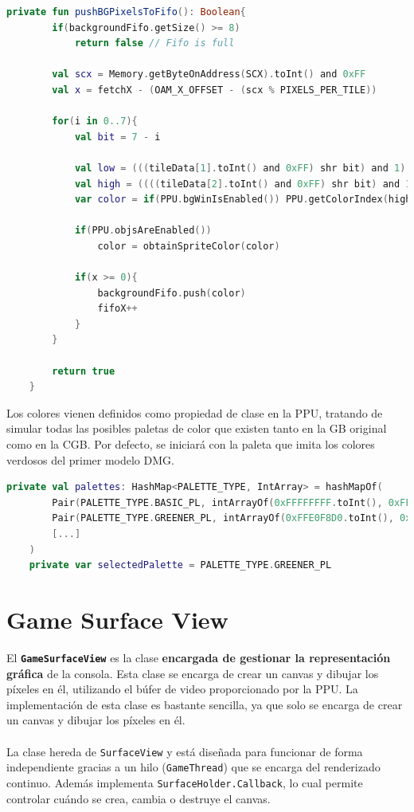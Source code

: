 \begin{lstlisting}[language=Kotlin, caption={FIFO Fetcher - Push de Píxeles al FIFO.}, label={code:ppufifopushpixels}]
    private fun pushBGPixelsToFifo(): Boolean{
        if(backgroundFifo.getSize() >= 8)
            return false // Fifo is full

        val scx = Memory.getByteOnAddress(SCX).toInt() and 0xFF
        val x = fetchX - (OAM_X_OFFSET - (scx % PIXELS_PER_TILE))

        for(i in 0..7){
            val bit = 7 - i

            val low = (((tileData[1].toInt() and 0xFF) shr bit) and 1)
            val high = ((((tileData[2].toInt() and 0xFF) shr bit) and 1) shl 1)
            var color = if(PPU.bgWinIsEnabled()) PPU.getColorIndex(high or low) else PPU.getColorIndex(0) // Pixel Color

            if(PPU.objsAreEnabled())
                color = obtainSpriteColor(color)

            if(x >= 0){
                backgroundFifo.push(color)
                fifoX++
            }
        }

        return true
    }
\end{lstlisting}

Los colores vienen definidos como propiedad de clase en la PPU, tratando de simular todas las posibles paletas de color que existen tanto en la GB original como en la CGB. Por defecto, se iniciará con la paleta que imita los colores verdosos del primer modelo DMG.

\begin{lstlisting}[language=Kotlin, caption={PPU - Paletas de Color.}, label={code:ppucolorpalettes}]
    private val palettes: HashMap<PALETTE_TYPE, IntArray> = hashMapOf(
        Pair(PALETTE_TYPE.BASIC_PL, intArrayOf(0xFFFFFFFF.toInt(), 0xFFAAAAAA.toInt(), 0xFF555555.toInt(), 0xFF000000.toInt())),
        Pair(PALETTE_TYPE.GREENER_PL, intArrayOf(0xFFE0F8D0.toInt(), 0xFF88C070.toInt(), 0xFF346856.toInt(), 0xFF081820.toInt())),
        [...]
    )
    private var selectedPalette = PALETTE_TYPE.GREENER_PL
\end{lstlisting}

\section{Game Surface View}

El \textbf{\texttt{GameSurfaceView}} es la clase \textbf{encargada de gestionar la representación gráfica} de la consola. Esta clase se encarga de crear un canvas y dibujar los píxeles en él, utilizando el búfer de video proporcionado por la PPU. La implementación de esta clase es bastante sencilla, ya que solo se encarga de crear un canvas y dibujar los píxeles en él.
\\\\
La clase hereda de \texttt{SurfaceView} y está diseñada para funcionar de forma independiente gracias a un hilo (\texttt{GameThread}) que se encarga del renderizado continuo. Además implementa \texttt{SurfaceHolder.Callback}, lo cual permite controlar cuándo se crea, cambia o destruye el canvas.

